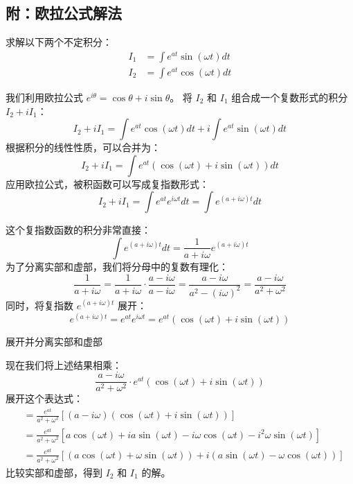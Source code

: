 \documentclass[lang=cn,newtx,10pt,scheme=chinese]{elegantbook}
\begin{document}
\subsection*{附：欧拉公式解法}

求解以下两个不定积分：
\begin{align*}
    I_1 &= \int e^{at} \sin(\omega t) dt \\
    I_2 &= \int e^{at} \cos(\omega t) dt
\end{align*}



我们利用欧拉公式 $e^{i\theta} = \cos\theta + i\sin\theta$。
将 $I_2$ 和 $I_1$ 组合成一个复数形式的积分 $I_2 + iI_1$：
\begin{equation}
    I_2 + iI_1 = \int e^{at} \cos(\omega t) dt + i \int e^{at} \sin(\omega t) dt
\end{equation}
根据积分的线性性质，可以合并为：
\begin{equation}
    I_2 + iI_1 = \int e^{at} (\cos(\omega t) + i\sin(\omega t)) dt
\end{equation}
应用欧拉公式，被积函数可以写成复指数形式：
\begin{equation}
    I_2 + iI_1 = \int e^{at} e^{i\omega t} dt = \int e^{(a+i\omega)t} dt
\end{equation}

这个复指数函数的积分非常直接：
\begin{equation}
    \int e^{(a+i\omega)t} dt = \frac{1}{a+i\omega} e^{(a+i\omega)t}
\end{equation}
为了分离实部和虚部，我们将分母中的复数有理化：
\begin{equation}
    \frac{1}{a+i\omega} = \frac{1}{a+i\omega} \cdot \frac{a-i\omega}{a-i\omega} = \frac{a-i\omega}{a^2 - (i\omega)^2} = \frac{a-i\omega}{a^2 + \omega^2}
\end{equation}
同时，将复指数 $e^{(a+i\omega)t}$ 展开：
\begin{equation}
    e^{(a+i\omega)t} = e^{at} e^{i\omega t} = e^{at}(\cos(\omega t) + i\sin(\omega t))
\end{equation}

展开并分离实部和虚部

现在我们将上述结果相乘：
\begin{equation}
    \frac{a-i\omega}{a^2 + \omega^2} \cdot e^{at}(\cos(\omega t) + i\sin(\omega t))
\end{equation}
展开这个表达式：
\begin{align*}
    &= \frac{e^{at}}{a^2 + \omega^2} [ (a-i\omega)(\cos(\omega t) + i\sin(\omega t)) ] \\
    &= \frac{e^{at}}{a^2 + \omega^2} [ a\cos(\omega t) + ia\sin(\omega t) - i\omega\cos(\omega t) - i^2\omega\sin(\omega t) ] \\
    &= \frac{e^{at}}{a^2 + \omega^2} [ (a\cos(\omega t) + \omega\sin(\omega t)) + i(a\sin(\omega t) - \omega\cos(\omega t)) ]
\end{align*}
比较实部和虚部，得到 $I_2$ 和 $I_1$ 的解。
\end{document}
